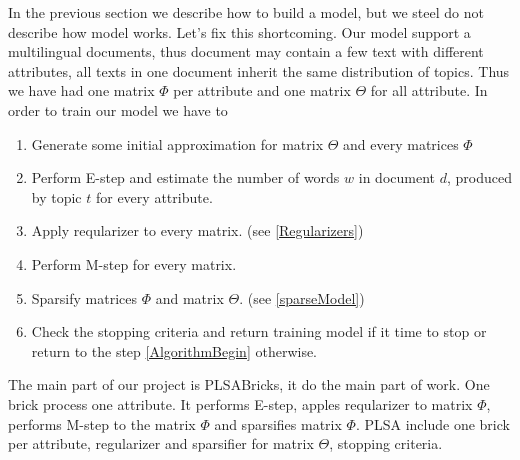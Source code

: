 In the previous section we describe how to build a model, but we steel do not describe how model works. 
Let's fix this shortcoming. Our model support a multilingual documents, thus document may contain a few text with
different attributes, all texts in one document inherit the same distribution of topics. Thus we have had one matrix $\Phi$ per
attribute and one matrix $\Theta$ for all attribute. In order to train our model we have to
\begin{enumerate}
    \item Generate some initial approximation for matrix $\Theta$ and every matrices $\Phi$
    \item \label{AlgorithmBegin} Perform E\--step and estimate the number of words $w$ in document $d$, produced by topic $t$ for every attribute.
    \item Apply reqularizer to every matrix. (see \ref{Regularizers})
    \item Perform M\--step for every matrix.
    \item Sparsify matrices $\Phi$ and matrix $\Theta$. (see \ref{sparseModel})
    \item Check the stopping criteria and return training model if it time to stop or return to the step \ref{AlgorithmBegin} otherwise.   
\end{enumerate}

The main part of our project is PLSABricks, it do the main part of work. One brick process one attribute. It performs E\--step, apples
reqularizer to matrix $\Phi$, performs M\--step to the matrix $\Phi$ and sparsifies matrix $\Phi$. PLSA include one brick per attribute,
regularizer and sparsifier for matrix $\Theta$, stopping criteria.  
